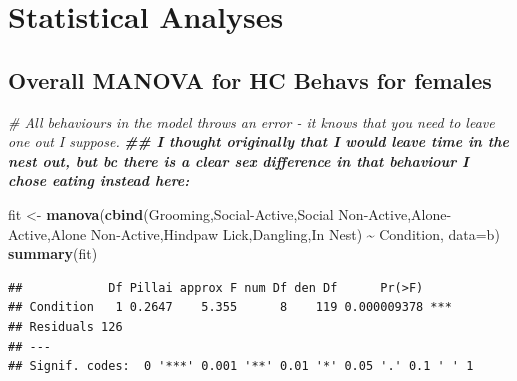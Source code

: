 \documentclass[
]{book}
\newenvironment{Shaded}{\begin{snugshade}}{\end{snugshade}}
\newcommand{\AttributeTok}[1]{\textcolor[rgb]{0.13,0.29,0.53}{#1}}
\newcommand{\CommentTok}[1]{\textcolor[rgb]{0.56,0.35,0.01}{\textit{#1}}}
\newcommand{\DocumentationTok}[1]{\textcolor[rgb]{0.56,0.35,0.01}{\textbf{\textit{#1}}}}
\newcommand{\FunctionTok}[1]{\textcolor[rgb]{0.13,0.29,0.53}{\textbf{#1}}}
\newcommand{\NormalTok}[1]{#1}
\newcommand{\OtherTok}[1]{\textcolor[rgb]{0.56,0.35,0.01}{#1}}
\newcommand{\SpecialCharTok}[1]{\textcolor[rgb]{0.81,0.36,0.00}{\textbf{#1}}}
\newcommand{\StringTok}[1]{\textcolor[rgb]{0.31,0.60,0.02}{#1}}
\begin{document}
\hypertarget{statistical-analyses-1}{%
\section*{Statistical Analyses}\label{statistical-analyses-1}}

\hypertarget{overall-manova-for-hc-behavs-for-females}{%
\subsection{Overall MANOVA for HC Behavs for females}\label{overall-manova-for-hc-behavs-for-females}}

\begin{Shaded}
\begin{Highlighting}[]
\CommentTok{\# All behaviours in the model throws an error {-} it knows that you need to leave one out I suppose. }
\DocumentationTok{\#\# I thought originally that I would leave time in the nest out, but bc there is a clear sex difference in that behaviour I chose eating instead here: }

\NormalTok{fit }\OtherTok{\textless{}{-}} \FunctionTok{manova}\NormalTok{(}\FunctionTok{cbind}\NormalTok{(Grooming,}\StringTok{\textasciigrave{}}\AttributeTok{Social{-}Active}\StringTok{\textasciigrave{}}\NormalTok{,}\StringTok{\textasciigrave{}}\AttributeTok{Social Non{-}Active}\StringTok{\textasciigrave{}}\NormalTok{,}\StringTok{\textasciigrave{}}\AttributeTok{Alone{-}Active}\StringTok{\textasciigrave{}}\NormalTok{,}\StringTok{\textasciigrave{}}\AttributeTok{Alone Non{-}Active}\StringTok{\textasciigrave{}}\NormalTok{,}\StringTok{\textasciigrave{}}\AttributeTok{Hindpaw Lick}\StringTok{\textasciigrave{}}\NormalTok{,}\StringTok{\textasciigrave{}}\AttributeTok{Dangling}\StringTok{\textasciigrave{}}\NormalTok{,}\StringTok{\textasciigrave{}}\AttributeTok{In Nest}\StringTok{\textasciigrave{}}\NormalTok{) }\SpecialCharTok{\textasciitilde{}}\NormalTok{ Condition, }\AttributeTok{data=}\NormalTok{b)}
\FunctionTok{summary}\NormalTok{(fit)}
\end{Highlighting}
\end{Shaded}

\begin{verbatim}
##            Df Pillai approx F num Df den Df      Pr(>F)    
## Condition   1 0.2647    5.355      8    119 0.000009378 ***
## Residuals 126                                              
## ---
## Signif. codes:  0 '***' 0.001 '**' 0.01 '*' 0.05 '.' 0.1 ' ' 1
\end{verbatim}
\end{document}
